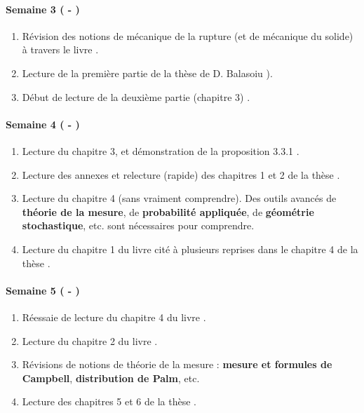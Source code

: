 \paragraph{Semaine 3 ( - )} 
\begin{enumerate}
    \item Révision des notions de mécanique de la rupture (et de mécanique du solide) à travers le livre \parencite{gross2017fracture}.
    \item Lecture de la première partie de la thèse de D. Balasoiu \parencite{balasoiu2020halthesis}).
    \item Début de lecture de la deuxième partie (chapitre 3) \parencite{balasoiu2020halthesis}.
\end{enumerate}
  

\paragraph{Semaine 4 ( - )} 
\begin{enumerate}
  \item Lecture du chapitre 3, et démonstration de la proposition 3.3.1 \parencite[p.93]{balasoiu2020halthesis}.
  \item Lecture des annexes et relecture (rapide) des chapitres 1 et 2 de la thèse \parencite{balasoiu2020halthesis}.
  \item Lecture du chapitre 4 (sans vraiment comprendre). Des outils avancés de \textbf{théorie de la mesure}, de \textbf{probabilité appliquée}, de \textbf{géométrie stochastique}, etc. sont nécessaires pour comprendre.
  \item Lecture du chapitre 1 du livre \parencite{chiu2013stochastic} cité à plusieurs reprises dans le chapitre 4 de la thèse \parencite{balasoiu2020halthesis}. 
\end{enumerate}

\paragraph{Semaine 5 ( - )} 
\begin{enumerate}
    \item Réessaie de lecture du chapitre 4 du livre \parencite{balasoiu2020halthesis}.
    \item Lecture du chapitre 2 du livre \parencite{chiu2013stochastic}.
    \item Révisions de notions de théorie de la mesure : \textbf{mesure et formules de Campbell}, \textbf{distribution de Palm}, etc.
    \item Lecture des chapitres 5 et 6 de la thèse \parencite{balasoiu2020halthesis}.
\end{enumerate}
  

